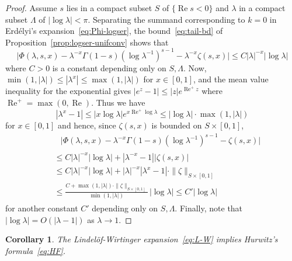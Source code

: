 \documentclass[11pt,a4paper,reqno]{amsart}
\renewcommand{\Re}{\operatorname{Re}}
\theoremstyle{plain}
\newtheorem{cor}[theorem]{Corollary}
\theoremstyle{remark}
\numberwithin{equation}{section}
\begin{document}
\begin{proof}
Assume $s$ lies in a compact subset $S$ of $\{ \Re s < 0 \}$ and $\lambda$ in a compact subset $\Lambda$ of $|\log \lambda| < \pi$. Separating the summand corresponding to $k = 0$ in Erd\'elyi's expansion~\eqref{eq:Phi-logser}, the bound~\eqref{eq:tail-bd} of Proposition~\ref{prop:logser-unifconv} shows that
\[
	\big|\Phi(\lambda,s,x) - \lambda^{-x}\Gamma(1-s){(\log \lambda^{-1})}^{s-1} - \lambda^{-x}\zeta(s,x)\big| 
	\leq C |\lambda|^{-x} |\log \lambda|
\]
where $C > 0$ is a constant depending only on $S,\Lambda$. Now, $\min(1,|\lambda|) \leq |\lambda^{x}| \leq \max(1,|\lambda|)$ for $x \in [0,1]$, and the mean value inequality for the exponential gives $|e^{z}-1| \leq |z| e^{\Re^{+} z}$ where $\Re^{+} = \max(0,\Re)$. Thus we have
\[
    |\lambda^{x} - 1| \leq |x \log\lambda| e^{x \Re^{+} \log\lambda} \leq |\log\lambda|\cdot \max(1,|\lambda|)
\]
for $x \in [0,1]$ and hence, since $\zeta(s,x)$ is bounded on $S \times [0,1]$,
\begin{multline*}
\qquad
	\big|\Phi(\lambda,s,x) - \lambda^{-x}\Gamma(1-s){(\log \lambda^{-1})}^{s-1} - \zeta(s,x)\big| 
	\\
  \begin{aligned}
	&\leq C |\lambda|^{-x} |\log \lambda| + |\lambda^{-x} - 1| |\zeta(s,x)|
	\\
	&\leq C |\lambda|^{-x} |\log \lambda| + |\lambda|^{-x}|\lambda^{x} - 1| \cdot \|\zeta\|_{S \times [0,1]}
	\\
	&\leq \frac{C  + \max(1,|\lambda|) \cdot \|\zeta\|_{S \times [0,1]}}{\min(1,|\lambda|)} \,|\log\lambda| 
	\leq C' |\log\lambda|
  \end{aligned}
\qquad
\end{multline*}
for another constant $C'$ depending only on $S,\Lambda$. Finally, note that $|\log \lambda| = O(|\lambda-1|)$ as $\lambda \to 1$.
\end{proof}

\begin{cor}
\label{cor:LW->HF}
The Lindel\"of-Wirtinger expansion~\eqref{eq:L-W} implies Hurwitz's formula~\eqref{eq:HF}.
\end{cor}
\end{document}

